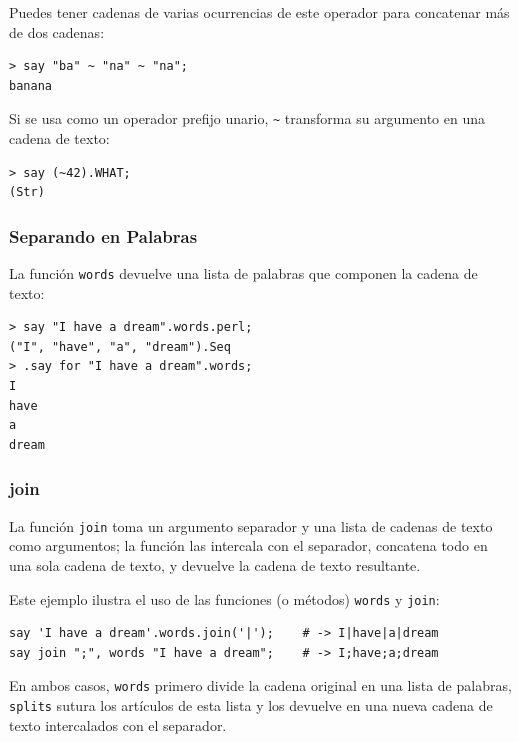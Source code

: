 Puedes tener cadenas de varias ocurrencias de este operador
para concatenar más de dos cadenas:

\begin{lstlisting}
> say "ba" ~ "na" ~ "na";
banana
\end{lstlisting}
%

Si se usa como un operador prefijo unario,
\verb|~| transforma su argumento en una cadena de texto:

\begin{lstlisting}
> say (~42).WHAT;
(Str)
\end{lstlisting}
%

\subsubsection{Separando en Palabras}

La función {\tt words} devuelve una lista de palabras
que componen la cadena de texto:

\begin{lstlisting}
> say "I have a dream".words.perl;
("I", "have", "a", "dream").Seq
> .say for "I have a dream".words;
I
have
a
dream
\end{lstlisting}
%

\subsubsection{join}

La función {\tt join} toma un argumento separador y una lista
de cadenas de texto como argumentos; la función las intercala
con el separador, concatena todo en una sola cadena de texto, y 
devuelve la cadena de texto resultante.

Este ejemplo ilustra el uso de las funciones (o métodos) 
{\tt words} y {\tt join}:

\begin{lstlisting}
say 'I have a dream'.words.join('|');    # -> I|have|a|dream
say join ";", words "I have a dream";    # -> I;have;a;dream
\end{lstlisting}
%

En ambos casos, {\tt words} primero divide la cadena original
en una lista de palabras,  {\tt splits} sutura los artículos
de esta lista y los devuelve en una nueva cadena de texto 
intercalados con el separador.

